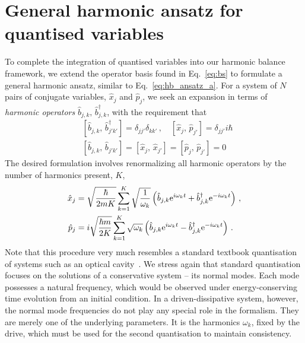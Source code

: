 \section{General harmonic ansatz for quantised variables} \label{sec:rwa_gen}

To complete the integration of quantised variables into our harmonic balance framework, we extend the operator basis found in Eq.~\eqref{eq:bs} to formulate a general harmonic ansatz, similar to Eq.~\eqref{eq:hb_ansatz_a}. For a system of $N$ pairs of conjugate variables, $\hat{x}_j$ and $\hat{p}_j$, we seek an expansion in terms of \textit{harmonic operators} $\hat{b}_{j,k} ,\, \hat{b}_{j,k}^\dagger$, with the requirement that
\begin{equation}
\begin{aligned}
&[\hat{b}_{j,k} , \, \hat{b}_{j'k'}^\dagger ] = \delta_{jj'} \delta_{kk'} \,, \quad  \left[\hat{x}_j , \, \hat{p}_{j'} \right ] = \delta_{jj'} i \hbar \\
&\left[\hat{b}_{j,k} , \, \hat{b}_{j'k'} \right] = \left[\hat{x}_j , \, \hat{x}_{j'} \right ] = \left[ \hat{p}_j ,\, \hat{p}_{j'} \right] = 0 
\end{aligned}
\end{equation}
The desired formulation involves renormalizing all harmonic operators by the number of harmonics present, $K$,
\begin{equation} \label{eq:rwa_general_ansatz}
\begin{aligned}
\hat{x}_j &= \sqrt{\frac{\hbar}{2mK}} \sum_{k=1}^K \sqrt{\frac{1}{\omega_k}} \left( \hat{b}_{j,k} {\rm e}^{i \omega_k t} + \hat{b}_{j,k}^{\dagger} {\rm e}^{-i \omega_{k} t} \right) \,, \\
\hat{p}_j &= i\sqrt{\frac{\hbar m}{2K} } \sum_{k=1}^K \sqrt{\omega_k} \left(\hat{b}_{j,k} {\rm e}^{i \omega_k t} - \hat{b}_{j,k}^{\dagger} {\rm e}^{-i \omega_{k} t} \right) \,.
\end{aligned}
\end{equation}
Note that this procedure very much resembles a standard textbook quantisation of systems such as an optical cavity~\cite{Walls_Milburn}. We stress again that standard quantisation focuses on the solutions of a conservative system -- its normal modes. Each mode possesses a natural frequency, which would be observed under energy-conserving time evolution from an initial condition. In a driven-dissipative system, however, the normal mode frequencies do not play any special role in the formalism. They are merely one of the underlying parameters. It is the harmonics $\omega_k$, fixed by the drive, which must be used for the second quantisation to maintain consistency.


